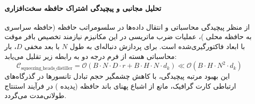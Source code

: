 \paragraph{تحلیل مجانبی و پیچیدگی اشتراک حافظه سخت‌افزاری}
از منظر پیچیدگی محاسباتی و انتقال داده‌ها در سلسومراتب حافظه (حافظه سراسری  به حافظه محلی )، عملیات ضرب ماتریسی در این مکانیزم نیازمند تخصیص بافر موقت با ابعاد فاکتورگیری‌شده است. برای پردازش دنباله‌ای به طول $N$ با بعد مخفی $D$، بار محاسباتی هسته از فرم درجه دو به رابطه زیر تقلیل می‌یابد:
\begin{equation}
\label{eq:complexity_squeezing_heads_distiller}
\mathcal{C}_{\text{squeezing\_heads\_distiller}} = \mathcal{O}\left( B \cdot N \cdot D \cdot r + B \cdot H \cdot N \cdot d_k \right) \ll \mathcal{O}\left( B \cdot H \cdot N^2 \cdot d_k \right)
\end{equation}
این بهبود مرتبه پیچیدگی، با کاهش چشمگیر حجم تبادل تانسورها در گذرگاه‌های ارتباطی کارت گرافیک، مانع از اشباع پهنای باند حافظه (پدیده ) در فرآیند استنتاج طولانی‌مدت می‌گردد.